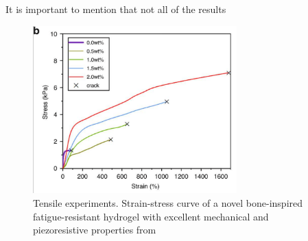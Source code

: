 It is important to mention that not all of the results 

\begin{figure}[ht!]
    \centering
    \includegraphics[width=0.7\textwidth]{figs/mechResponse/mech_response1.png}
    \caption{Tensile experiments. Strain-stress curve  of a novel bone-inspired fatigue-resistant hydrogel with excellent mechanical and piezoresistive properties from\citep{lyuBoneinspiredGNECHAPAAm2023}}
\end{figure}


